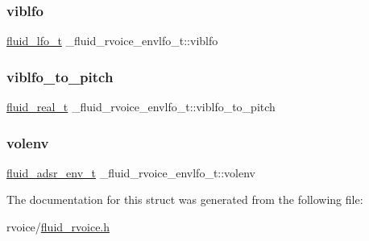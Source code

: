 \subsubsection{\texorpdfstring{viblfo}{viblfo}}
{\footnotesize\ttfamily \hyperlink{fluid__lfo_8h_af55e78144a43622031cd41ec0f044b85}{fluid\+\_\+lfo\+\_\+t} \+\_\+fluid\+\_\+rvoice\+\_\+envlfo\+\_\+t\+::viblfo}

\mbox{\label{struct__fluid__rvoice__envlfo__t_aca22c12e458985567c65eaf11435b2dc}} 
\subsubsection{\texorpdfstring{viblfo\+\_\+to\+\_\+pitch}{viblfo\_to\_pitch}}
{\footnotesize\ttfamily \hyperlink{fluidsynth__priv_8h_a9e96f0917747b69cabb7c671bc693dbb}{fluid\+\_\+real\+\_\+t} \+\_\+fluid\+\_\+rvoice\+\_\+envlfo\+\_\+t\+::viblfo\+\_\+to\+\_\+pitch}

\mbox{\label{struct__fluid__rvoice__envlfo__t_a866feac7049752f2fe82701b4a1075b4}} 
\subsubsection{\texorpdfstring{volenv}{volenv}}
{\footnotesize\ttfamily \hyperlink{fluid__adsr__env_8h_aa25feae46766a240357227c5113d2363}{fluid\+\_\+adsr\+\_\+env\+\_\+t} \+\_\+fluid\+\_\+rvoice\+\_\+envlfo\+\_\+t\+::volenv}



The documentation for this struct was generated from the following file\+:\begin{DoxyCompactItemize}
\item 
rvoice/\hyperlink{fluid__rvoice_8h}{fluid\+\_\+rvoice.\+h}\end{DoxyCompactItemize}
